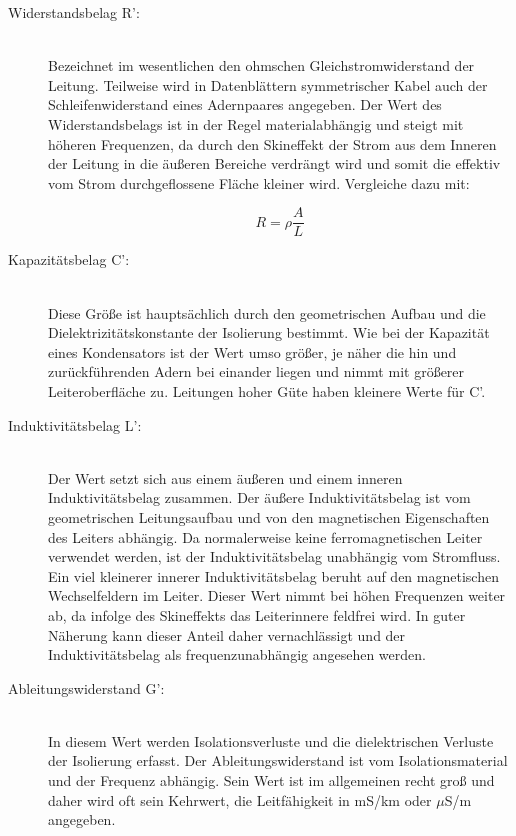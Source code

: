 	\begin{description}
		\item[Widerstandsbelag R':] \hfill\\
			Bezeichnet im wesentlichen den ohmschen Gleichstromwiderstand der Leitung. 
			Teilweise wird in Datenblättern symmetrischer Kabel auch der Schleifenwiderstand eines Adernpaares angegeben. 
			Der Wert des Widerstandsbelags ist in der Regel materialabhängig und steigt mit höheren Frequenzen, da durch den Skineffekt der Strom aus dem Inneren der Leitung in die äußeren Bereiche verdrängt wird und somit die effektiv vom Strom durchgeflossene Fläche kleiner wird. 
			Vergleiche dazu mit:

			\begin{equation}	
				R = \rho \dfrac{A}{L}		
			\end{equation}

		\item[Kapazitätsbelag C':]\hfill\\
			Diese Größe ist hauptsächlich durch den geometrischen Aufbau und die Dielektrizitätskonstante der Isolierung bestimmt. 
			Wie bei der Kapazität  eines Kondensators ist der Wert umso größer, je näher die hin und zurückführenden Adern bei einander liegen und nimmt mit größerer Leiteroberfläche zu. 
			Leitungen hoher Güte haben kleinere Werte für C'.

		\item[Induktivitätsbelag L':]\hfill\\
			Der Wert setzt sich aus einem äußeren und einem inneren Induktivitätsbelag zusammen. 
			Der äußere Induktivitätsbelag ist vom geometrischen Leitungsaufbau und von den magnetischen Eigenschaften des Leiters abhängig. 
			Da normalerweise keine ferromagnetischen Leiter verwendet werden, ist der Induktivitätsbelag unabhängig vom Stromfluss. 
			Ein viel kleinerer innerer Induktivitätsbelag beruht auf den magnetischen Wechselfeldern im Leiter. 
			Dieser Wert nimmt bei höhen Frequenzen weiter ab, da infolge des Skineffekts das Leiterinnere feldfrei wird. 
			In guter Näherung kann dieser Anteil daher vernachlässigt und der Induktivitätsbelag als frequenzunabhängig angesehen werden.

		\item[Ableitungswiderstand G':]\hfill\\
			In diesem Wert werden Isolationsverluste und die dielektrischen Verluste der Isolierung erfasst. 
			Der Ableitungswiderstand ist vom Isolationsmaterial und der Frequenz abhängig. 
			Sein Wert ist im allgemeinen recht groß und daher wird oft sein Kehrwert, die Leitfähigkeit in mS/km oder $\mu$S/m angegeben.
	\end{description}

